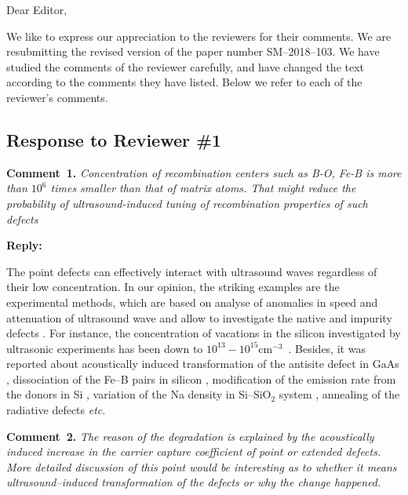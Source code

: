 \documentclass [sort&compress] {elsarticle}
\begin{document}
Dear Editor,

We like to express our appreciation to the reviewers for their comments.
We are resubmitting the revised version of the paper number SM--2018--103.
We have studied the comments of the reviewer carefully, and have changed the text according to the comments they
have listed.
Below we refer to each of the reviewer’s comments.




\subsection*{Response to Reviewer \#1 }

\noindent
\textcolor[rgb]{0.00,0.50,1.00}{\textbf{Comment~1.}}
\emph{Concentration of recombination centers such as B-O, Fe-B is more than $10^6$ times smaller than that of matrix atoms. That might reduce the probability of ultrasound-induced tuning of recombination properties of such defects}

\noindent
\textcolor[rgb]{0.51,0.00,0.00}{\textbf{Reply:}}

The point defects can effectively interact with ultrasound waves regardless of their low concentration.
In our opinion, the striking examples are the experimental methods, which are based on analyse of 
 anomalies in speed and attenuation  of ultrasound wave
 and allow to investigate the native and impurity defects \cite{USM:SEYIDOV2016,USM:Zhevstovskikh,USM:Averkin2014,USM:Akatsu2009,USM:Okabe2013}.
For instance, the concentration of vacations in the silicon investigated by ultrasonic experiments has been down to $10^{13}-10^{15}$cm$^{−3}$~\cite{USM:Averkin2014,USM:Okabe2013}.
Besides, it was reported about acoustically induced 
transformation of the antisite defect in GaAs \cite{Ostapenko1994},
dissociation of the Fe--B pairs in silicon \cite{Ostapenko1995},
modification of the emission rate from the donors in Si \cite{Korotchenkov1995},
variation of the Na density in Si--SiO$_2$ system \cite{UST:Medvid},
annealing of the radiative defects \cite{Gorb2010,Podolian2012}
\emph{etc}.


\vspace{1cm}
\noindent
\textcolor[rgb]{0.00,0.50,1.00}{\textbf{Comment~2.}}
\emph{The reason of the degradation is explained by the acoustically induced increase
in the carrier capture coefficient of point or extended defects. More detailed discussion of this point would be interesting as to whether it means ultrasound--induced transformation of the defects or why the change happened.}
\end{document}
